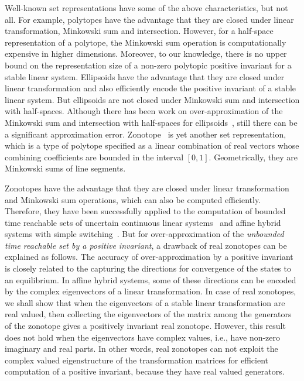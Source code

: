 Well-known set representations have some of the above characteristics,
but not all.  For example, polytopes have the advantage that they are
closed under linear transformation, Minkowski sum and intersection.
However, for a half-space representation of a polytope, the Minkowski
sum operation is computationally expensive in higher dimensions.
Moreover, to our knowledge, there is no upper bound on the
representation size of a non-zero polytopic positive invariant for a
stable linear system.  Ellipsoids have the advantage that they are
closed under linear transformation and also efficiently encode the
positive invariant of a stable linear system.  But ellipsoids are not
closed under Minkowski sum and intersection with half-spaces.
Although there has been work on over-approximation of the Minkowski
sum and intersection with half-spaces for
ellipsoids~\cite{allamigeon2017fast,kurzhanskiy2006ellipsoidal}, still
there can be a significant approximation
error. Zonotope~\cite{DBLP:conf/hybrid/Girard05} is yet another set
representation, which is a type of polytope specified as a linear
combination of real vectors whose combining coefficients are bounded
in the interval $[0,1]$.  Geometrically, they are Minkowski sums of
line segments.  

Zonotopes have the advantage that they are closed under linear
transformation and Minkowski sum operations, which can also be
computed efficiently.  Therefore, they have been successfully applied
to the computation of bounded time reachable sets of uncertain
continuous linear systems~\cite{DBLP:conf/hybrid/Girard05} and affine
hybrid systems with simple
switching~\cite{makhlouf2014networked,girard2008zonotope}.  But for
over-approximation of the {\it unbounded time reachable set by a
positive invariant}, a drawback of real zonotopes can be explained as follows.  
The accuracy of over-approximation by a positive invariant
is closely related to the capturing the directions for convergence of
the states to an equilibrium.  In affine hybrid systems, some of these
directions can be encoded by the complex eigenvectors of a linear
transformation.  In case of real zonotopes, we shall show that when
the eigenvectors of a stable linear transformation are real valued,
then collecting the eigenvectors of the matrix among the generators of
the zonotope gives a positively invariant real zonotope.  However,
this result does not hold when the eigenvectors have complex values,
i.e., have non-zero imaginary and real parts.  In other words, real
zonotopes can not exploit the complex valued eigenstructure of the
transformation matrices for efficient computation of a positive
invariant, because they have real valued generators.

